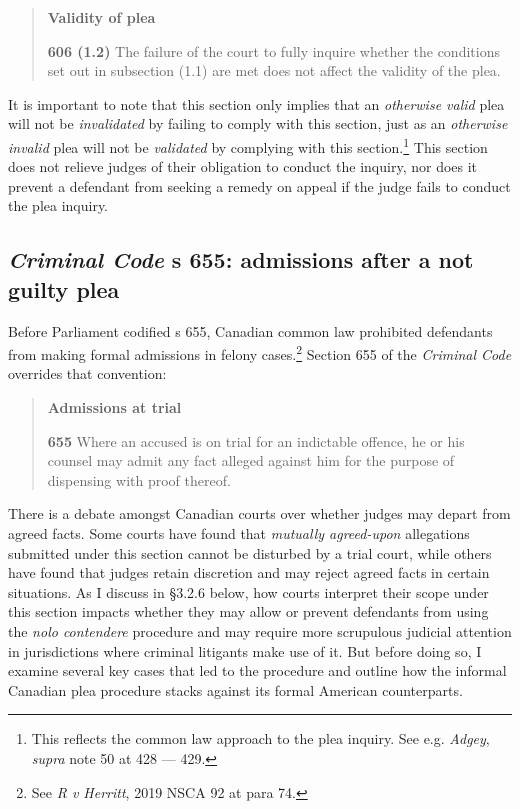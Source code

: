 \begin{quote}
    \onehalfspacing
    \textbf{Validity of plea}
    
    \textbf{606 (1.2)} The failure of the court to fully inquire whether the conditions set out in subsection (1.1) are met does not affect the validity of the plea.
\end{quote}
It is important to note that this section only implies that an \textit{otherwise valid} plea will not be \textit{invalidated} by failing to comply with this section, just as an \textit{otherwise invalid} plea will not be \textit{validated} by complying with this section.\footnote{This reflects the common law approach to the plea inquiry. See e.g. \textit{Adgey}, \textit{supra} note 50 at 428 — 429.} This section does not relieve judges of their obligation to conduct the inquiry, nor does it prevent a defendant from seeking a remedy on appeal if the judge fails to conduct the plea inquiry.

\subsection{\textit{Criminal Code} s 655: admissions after a not guilty plea}

Before Parliament codified s 655, Canadian common law prohibited defendants from making formal admissions in felony cases.\footnote{See \textit{R v Herritt}, 2019 NSCA 92 at para 74.} Section 655 of the \textit{Criminal Code} overrides that convention:

\begin{quote}
    \singlespacing
    \textbf{Admissions at trial}
    
    \textbf{655} Where an accused is on trial for an indictable offence, he or his counsel may admit any fact alleged against him for the purpose of dispensing with proof thereof.
\end{quote}
There is a debate amongst Canadian courts over whether judges may depart from agreed facts. Some courts have found that \textit{mutually agreed-upon} allegations submitted under this section cannot be disturbed by a trial court, while others have found that judges retain discretion and may reject agreed facts in certain situations. As I discuss in \S 3.2.6 below, how courts interpret their scope under this section impacts whether they may allow or prevent defendants from using the \textit{nolo contendere} procedure and may require more scrupulous judicial attention in jurisdictions where criminal litigants make use of it. But before doing so, I examine several key cases that led to the procedure and outline how the informal Canadian plea procedure stacks against its formal American counterparts.
